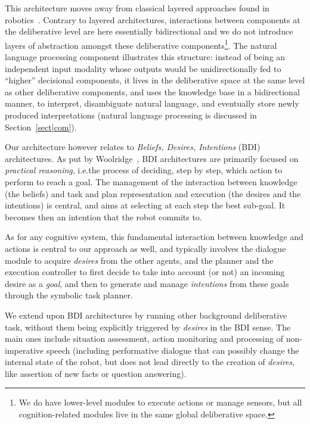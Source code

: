 \documentclass[preprint,3p,times]{elsarticle}
\newcommand{\ie}{{i.e.\xspace}}
\begin{document}
This architecture moves away from classical layered approaches found in
robotics~\cite{Gat1998three, Volpe2001CLARAty, Goldberg2002}. Contrary to
layered architectures, interactions between components at the deliberative level
are here essentially bidirectional and we do not introduce layers of abstraction
amongst these deliberative components\footnote{We do have lower-level modules to
execute actions or manage sensors, but all cognition-related modules live in the
same global deliberative space.}. The natural language processing component
illustrates this structure: instead of being an independent input modality whose
outputs would be unidirectionally fed to ``higher'' decisional components, it
lives in the deliberative space at the same level as other deliberative
components, and uses the knowledge base in a bidirectional manner, to interpret,
disambiguate natural language, and eventually store newly produced
interpretations (natural language processing is discussed in
Section~\ref{sect|com}).

Our architecture however relates to \emph{Beliefs, Desires, Intentions} (BDI)
architectures. As put by Woolridge~\cite{Woolridge1999}, BDI architectures are
primarily focused on \emph{practical reasoning}, \ie the process of deciding,
step by step, which action to perform to reach a goal. The management of the
interaction between knowledge (the beliefs) and task and plan representation and
execution (the desires and the intentions) is central, and aims at selecting at
each step the best sub-goal. It becomes then an intention that the robot commits
to.

As for any cognitive system, this fundamental interaction between knowledge and
actions is central to our approach as well, and typically involves the dialogue
module to acquire \emph{desires} from the other agents, and the planner and the
execution controller to first decide to take into account (or not) an
incoming desire as a \emph{goal}, and then to generate and manage
\emph{intentions} from these goals through the symbolic task planner.

We extend upon BDI architectures by running other background deliberative task,
without them being explicitly triggered by \emph{desires} in the BDI sense.
The main ones include situation assessment, action monitoring and processing of
non-imperative speech (including performative dialogue that can possibly change
the internal state of the robot, but does not lead directly to the creation of
\emph{desires}, like assertion of new facts or question answering).
\end{document}
